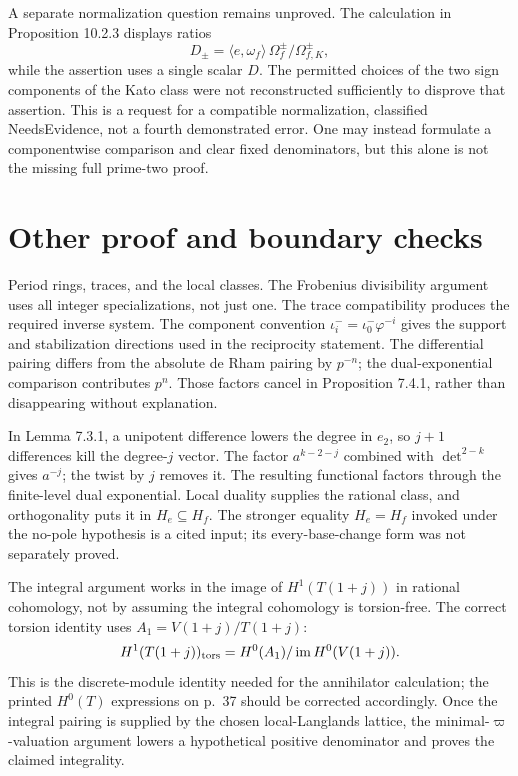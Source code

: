 \documentclass[10pt]{article}
\begin{document}
A separate normalization question remains unproved. The calculation in Proposition 10.2.3 displays ratios \[D_\pm=\langle e,\omega_f\rangle\,
           \Omega_f^\pm/\Omega_{f,K}^\pm,\] while the assertion uses a single scalar \(D\). The permitted choices of the two sign components of the Kato class were not reconstructed sufficiently to disprove that assertion. This is a request for a compatible normalization, classified NeedsEvidence, not a fourth demonstrated error. One may instead formulate a componentwise comparison and clear fixed denominators, but this alone is not the missing full prime-two proof.\par
\section*{Other proof and boundary checks}
Period rings, traces, and the local classes. The Frobenius divisibility argument uses all integer specializations, not just one. The trace compatibility produces the required inverse system. The component convention \(\iota_i^-=\iota_0^-\varphi^{-i}\) gives the support and stabilization directions used in the reciprocity statement. The differential pairing differs from the absolute de Rham pairing by \(p^{-n}\); the dual-exponential comparison contributes \(p^n\). Those factors cancel in Proposition 7.4.1, rather than disappearing without explanation.\par
In Lemma 7.3.1, a unipotent difference lowers the degree in \(e_2\), so \(j+1\) differences kill the degree-\(j\) vector. The factor \(a^{k-2-j}\) combined with \(\det^{2-k}\) gives \(a^{-j}\); the twist by \(j\) removes it. The resulting functional factors through the finite-level dual exponential. Local duality supplies the rational class, and orthogonality puts it in \(H_e\subseteq H_f\). The stronger equality \(H_e=H_f\) invoked under the no-pole hypothesis is a cited input; its every-base-change form was not separately proved.\par
The integral argument works in the image of \(H^1(T(1+j))\) in rational cohomology, not by assuming the integral cohomology is torsion-free. The correct torsion identity uses \(A_1=V(1+j)/T(1+j)\): \[H^1(T(1+j))_{\rm tors}
 =H^0(A_1)/\operatorname{im}H^0(V(1+j)).\] This is the discrete-module identity needed for the annihilator calculation; the printed \(H^0(T)\) expressions on p. 37 should be corrected accordingly. Once the integral pairing is supplied by the chosen local-Langlands lattice, the minimal-\(\varpi\)-valuation argument lowers a hypothetical positive denominator and proves the claimed integrality.\par
\end{document}
